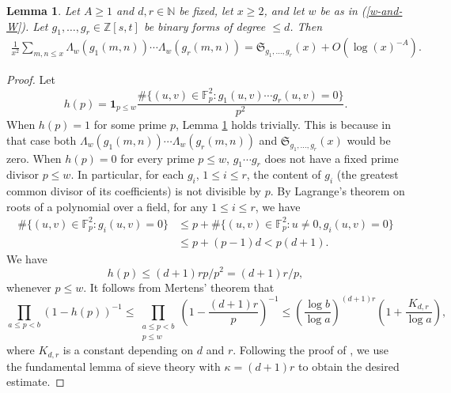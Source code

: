 \documentclass[reqno, 11pt]{amsart}
\renewcommand{\leq}{\leqslant}
\renewcommand{\geq}{\geqslant}
\newtheorem{lemma}[theorem]{Lemma}
\theoremstyle{definition}
\theoremstyle{definition}
\renewcommand{\geq}{\geqslant}
\renewcommand{\leq}{\leqslant}
\newcommand{\FF}{\mathbb{F}}
\newcommand{\ZZ}{\mathbb{Z}}
\newcommand{\NN}{\mathbb{N}}
\numberwithin{equation}{section}
\begin{document}
\begin{lemma}\label{mod-Cra}
	Let $A \geq 1$ and $d, r \in \NN$ be fixed, let $x \geq 2$, and let $w$ be as in (\ref{w-and-W}). Let $g_1, \dots, g_r \in \ZZ[s,t]$ be binary forms of degree $\leq d$. Then
	\begin{align}
		\frac{1}{x^2}\sum_{m, n \leq x} \Lambda_w(g_1(m,n)) \cdots \Lambda_w(g_r(m,n)) = \mathfrak{S}_{g_1, \dots, g_r}(x) + O(\log(x)^{-A}).
	\end{align}
\end{lemma}
\begin{proof}
	Let $$h(p) = \mathbf{1}_{p \leq w} \frac{\#\{(u, v) \in \FF_p^2: g_1(u, v) \cdots g_r(u, v) = 0 \}}{p^2}.$$  When $h(p) = 1$ for some prime $p$, Lemma \ref{mod-Cra} holds trivially. This is because in that case both $\Lambda_w(g_1(m,n)) \cdots \Lambda_w(g_r(m,n))$ and $\mathfrak{S}_{g_1, \dots, g_r}(x)$ would be zero. When $h(p) = 0$ for every prime $p \leq w$, $g_1 \cdots g_r$ does not have a fixed prime divisor $p \leq w$. In particular, for each $g_i$, $1 \leq i \leq r$, the content of $g_i$ (the greatest common divisor of its coefficients) is not divisible by $p$. By Lagrange's theorem on roots of a polynomial over a field, for any $1 \leq i \leq r$, we have
	\begin{align*}
		\#\{(u, v) \in \FF_p^2: g_i(u, v) = 0 \} & \leq p + \#\{(u, v) \in \FF_p^2: u \neq 0, g_i(u, v) = 0 \} \\
		& \leq p + (p-1)d  < p (d+1).
	\end{align*}
	We have
	$$h(p) \leq (d+1)rp/p^2 = (d+1)r/p,$$
	whenever $p \leq w$. It follows from Mertens' theorem that
	$$\prod_{a \leq p < b}(1 - h(p))^{-1} \leq \prod_{\substack{a \leq p < b \\ p \leq w}} \left( 1 - \frac{(d+1)r}{p} \right)^{-1} \leq \left( \frac{\log b}{\log a} \right)^{(d+1)r} \left( 1 + \frac{K_{d, r}}{\log a} \right), $$
	where $K_{d, r}$ is a constant depending on $d$ and $r$. Following the proof of \cite[Lemma 5.1]{BST}, we use the fundamental lemma of sieve theory \cite[Fundamental lemma 6.3]{Iwa-Kow} with $\kappa = (d+1)r$ to obtain the desired estimate.
\end{proof}
\end{document}
